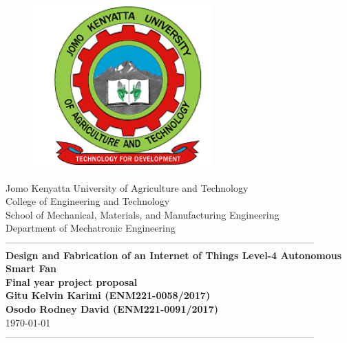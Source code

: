 \documentclass[12pt,fleqn]{article}
\newcommand{\yesthreeday}{{\AdvanceDate[-4]\today}}
\begin{document}
\begin{titlepage}
  \begin{center}
      \vspace*{-4.0cm}
    \begin{figure}[!h]
\centering
\includegraphics[width=0.3\linewidth]{Figures/JKUAT_logo}
\label{fig:jomologo}
\end{figure}
   \large{Jomo Kenyatta University of Agriculture and Technology}\\
    \large{College of Engineering and Technology}\\
    \large{School of Mechanical, Materials, and Manufacturing Engineering}\\
   \large{Department of Mechatronic Engineering}\\

    ------------------------------------------------------------------------------------------------\\[1.0cm]
    \LARGE{\textbf{Design and Fabrication of an Internet of Things Level-4 Autonomous Smart Fan}}\\[0.6cm]
    
    \LARGE{\textbf{Final year project proposal
            }}\\[1.5cm]

    \vspace{0.5cm}
    \large{\textbf{Gitu Kelvin Karimi (ENM221-0058/2017)
            }}\\
     \large{\textbf{Osodo Rodney David (ENM221-0091/2017)
            }}\\[1.0cm]

    \large{\small{\yesthreeday}}\\
    ------------------------------------------------------------------------------------------------\\[1.5cm]
  \end{center}
\end{titlepage}
%
\end{document}
